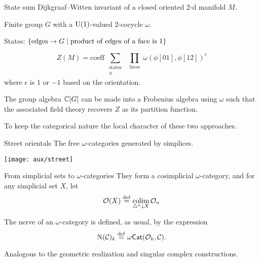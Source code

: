 \begin{frame}[fragile]{State sum}
	\pause
	Dijkgraaf--Witten invariant of a closed oriented 2-d manifold $M$.

	\pause\medskip
	Finite group $G$ with a $\mathrm{U}(1)$-valued 2-cocycle $\omega$.

	\pause\smallskip
	States: $\{\text{edges} \to G \mid \text{product of edges of a face is } 1\}$

	\pause\medskip
	\[
	Z(M) = \text{coeff} \
	\sum_{\substack{\text{states} \\ \phi}} \
	\prod_{\substack{\text{faces} \\ [012]}}
	\omega(\phi[01], \phi[12])^{\epsilon}
	\]
	where $\epsilon$ is $1$ or $-1$ based on the orientation.

	\pause\bigskip
	The group algebra $\mathbb{C}[G]$ can be made into a Frobenius algebra using $\omega$ such that the associated field theory recovers $Z$ as its partition function.

	\pause\bigskip
	 To keep the categorical nature  the local character of these two approaches.
\end{frame}

\begin{frame}{Street orientals}
	\pause
	The free $\omega$-categories generated by simplices.

	\begin{center}
		\texttt{[image: aux/street]}
	\end{center}
\end{frame}

\begin{frame}{From simplicial sets to $\omega$-categories}
	\pause
	They form a cosimplicial $\omega$-category, and for any simplicial set $X$, let
	\[
	\mathcal{O}(X) \stackrel{\mathrm{def}}{=} \operatorname*{colim}_{\triangle^n \downarrow X} \mathcal{O}_n
	\]

	\pause\bigskip
	The nerve of an $\omega$-category is defined, as usual, by the expression
	\[
	\mathrm{N}(\mathcal{C})_k \stackrel{\mathrm{def}}{=} \omega\mathsf{Cat}(\mathcal{O}_k, \mathcal{C}).
	\]

	\pause\bigskip
	Analogous to the geometric realization and singular complex constructions.
\end{frame}


